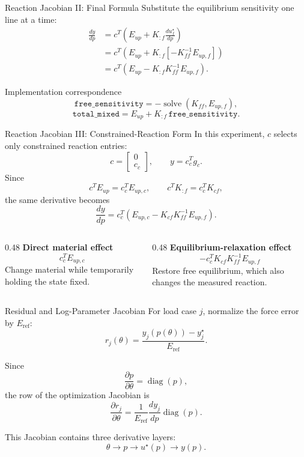 \documentclass[aspectratio=169,10pt]{beamer}
\newcommand{\eref}{E_{\mathrm{ref}}}
\newcommand{\Kff}{K_{\!ff}}
\newcommand{\Eup}{E_{up}}
\newcommand{\Eupf}{E_{up,f}}
\begin{document}
\begin{frame}{Reaction Jacobian II: Final Formula}
  \small
  Substitute the equilibrium sensitivity one line at a time:
  \begin{align*}
    \frac{dy}{dp}
    &=
    c^T\left(
      \Eup+K_{:f}\frac{du_f^\star}{dp}
    \right)\\[0.3em]
    &=
    c^T\left(
      \Eup+K_{:f}\left[-\Kff^{-1}\Eupf\right]
    \right)\\[0.3em]
    &=
    \boxed{
      c^T\left(
        \Eup-K_{:f}\Kff^{-1}\Eupf
      \right)
    }.
  \end{align*}

  \begin{block}{Implementation correspondence}
    \[
      \texttt{free\_sensitivity}
      =-\operatorname{solve}(\Kff,\Eupf),
    \]
    \[
      \texttt{total\_mixed}
      =\Eup+K_{:f}\,\texttt{free\_sensitivity}.
    \]
  \end{block}
\end{frame}

\begin{frame}{Reaction Jacobian III: Constrained-Reaction Form}
  \small
  In this experiment, $c$ selects only constrained reaction entries:
  \[
    c=
    \begin{bmatrix}0\\c_c\end{bmatrix},
    \qquad
    y=c_c^Tg_c.
  \]
  Since
  \[
    c^T\Eup=c_c^TE_{up,c},
    \qquad
    c^TK_{:f}=c_c^TK_{cf},
  \]
  the same derivative becomes
  \[
    \boxed{
      \frac{dy}{dp}
      =
      c_c^T
      \left(
        E_{up,c}
        -
        K_{cf}\Kff^{-1}\Eupf
      \right)
    }.
  \]

  \begin{columns}[T]
    \begin{column}{0.48\linewidth}
      \textbf{Direct material effect}
      \[
        c_c^TE_{up,c}
      \]
      Change material while temporarily holding the state fixed.
    \end{column}
    \begin{column}{0.48\linewidth}
      \textbf{Equilibrium-relaxation effect}
      \[
        -c_c^TK_{cf}\Kff^{-1}\Eupf
      \]
      Restore free equilibrium, which also changes the measured reaction.
    \end{column}
  \end{columns}
\end{frame}

\begin{frame}{Residual and Log-Parameter Jacobian}
  \small
  For load case $j$, normalize the force error by $\eref$:
  \[
    r_j(\theta)
    =
    \frac{y_j(p(\theta))-y_j^\star}{\eref}.
  \]

  Since
  \[
    \frac{\partial p}{\partial\theta}
    =\operatorname{diag}(p),
  \]
  the row of the optimization Jacobian is
  \[
    \boxed{
      \frac{\partial r_j}{\partial\theta}
      =
      \frac{1}{\eref}
      \frac{dy_j}{dp}\operatorname{diag}(p)
    }.
  \]

  This Jacobian contains three derivative layers:
  \[
    \theta
    \longrightarrow p
    \longrightarrow u^\star(p)
    \longrightarrow y(p).
  \]
\end{frame}
\end{document}
